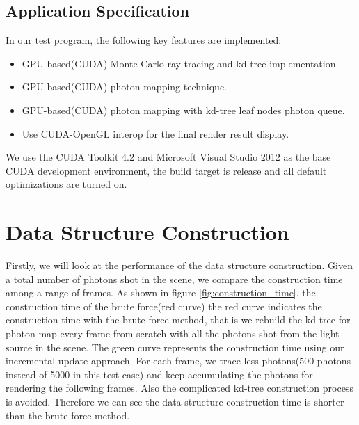 \subsection{Application Specification}

In our test program, the following key features are implemented: 

\begin{itemize}

\item{GPU-based(CUDA) Monte-Carlo ray tracing and kd-tree implementation.}

\item{GPU-based(CUDA) photon mapping technique. } 

\item{GPU-based(CUDA) photon mapping with kd-tree leaf nodes photon queue.} 

\item{Use CUDA-OpenGL interop for the final render result display. }

\end{itemize}

We use the CUDA Toolkit 4.2 and Microsoft Visual Studio 2012 as the base CUDA development environment, the build target is release and all default optimizations are turned on. 


\section{Data Structure Construction}
\label{sec:build_time}

Firstly, we will look at the performance of the data structure construction. Given a total number of photons shot in the scene, we compare the construction time among a range of frames. As shown in figure \ref{fig:construction_time}, the construction time of the brute force(red curve)  the red curve indicates the construction time with the brute force method, that is we rebuild the kd-tree for photon map every frame from scratch with all the photons shot from the light source in the scene. The green curve represents the construction time using our incremental update approach. For each frame, we trace less photons(500 photons instead of 5000 in this test case) and keep accumulating the photons for rendering the following frames. Also the complicated kd-tree construction process is avoided. Therefore we can see the data structure construction time is shorter than the brute force method. 

